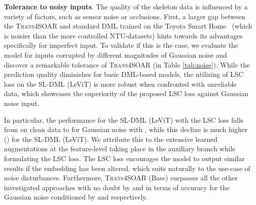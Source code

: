 \documentclass[lettersize,journal]{IEEEtran}
\newcommand{\mypar}[1]{\vspace{0.1cm}\noindent\textbf{#1}.}
\begin{document}
\mypar{Tolerance to noisy inputs}
The quality of the skeleton data is influenced by a variety of factors, such as sensor noise or occlusions. First, a larger gap between the \textsc{Trans4SOAR} and standard DML trained on the Toyota Smart Home~\cite{Das_2019_ICCV} (which is noisier than the more controlled NTU-datasets) hints towards its advantages specifically for imperfect input. To validate if this is the case, we evaluate the model for inputs corrupted by different magnitudes of Gaussian noise and discover a remarkable tolerance of \textsc{Trans4SOAR} (in Table \ref{tab:noise}).
While the prediction quality diminishes for basic DML-based models, the utilizing of LSC loss on the SL-DML (LeViT) is more robust when confronted with unreliable data, which showcases the superiority of the proposed LSC loss against Gaussian noise input. 

In particular, the performance for the SL-DML (LeViT) with the LSC loss falls from  on clean data to  for Gaussian noise with , while this decline is much higher () for the SL-DML (LeViT). We attribute this to the extensive learned augmentations at the feature-level taking place in the auxiliary branch while formulating the LSC loss. The LSC loss encourages the model to output similar results if the embedding has been altered, which suits naturally to the use-case of noise disturbances.
Furthermore, \textsc{Trans4SOAR} (Base) surpasses all the other investigated approaches with no doubt by  and  in terms of accuracy for the Gaussian noise conditioned by  and  respectively.
\end{document}
